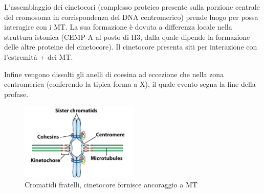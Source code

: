             L'assemblaggio dei cinetocori (complesso proteico presente sulla porzione centrale del cromosoma in corrispondenza del DNA centromerico) prende luogo per possa interagire con i MT. 
            La sua formazione è dovuta a differenza locale nella struttura istonica (CEMP-A al posto di H3, dalla quale dipende la formazione delle altre proteine del cinetocore). Il cinetocore presenta siti per interazione con l’estremità + dei MT.
            
            Infine vengono dissolti gli anelli di coesina ad eccezione che nella zona centromerica (conferendo la tipica forma a X), il quale evento segna la fine della profase.
            \begin{figure}[h]
                \centering
                \includegraphics[width=0.5\textwidth]{images/cromatidi.JPG}
                \caption{\small Cromatidi fratelli, cinetocore fornisce ancoraggio a MT}
                \label{fig:mesh1}
            \end{figure}
            
